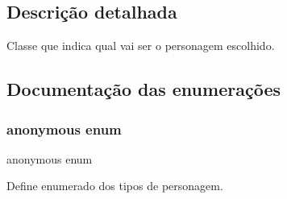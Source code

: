 \subsection{Descrição detalhada}
Classe que indica qual vai ser o personagem escolhido. 

\subsection{Documentação das enumerações}
\mbox{\label{classCharacterSelection_a14b33a13e3498992faa7261e6f5e55ca}} 
\subsubsection{\texorpdfstring{anonymous enum}{anonymous enum}}
{\footnotesize\ttfamily anonymous enum}



Define enumerado dos tipos de personagem. 

